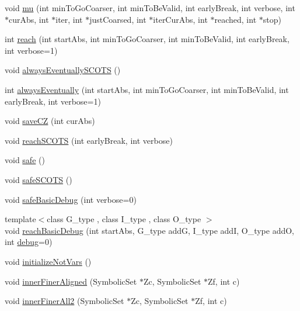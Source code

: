 \begin{DoxyCompactItemize}
\item 
void \hyperlink{classscots_1_1Adaptive_a56ba7fb25e948dd1f2fa0c7380ca59e6}{mu} (int min\+To\+Go\+Coarser, int min\+To\+Be\+Valid, int early\+Break, int verbose, int $\ast$cur\+Abs, int $\ast$iter, int $\ast$just\+Coarsed, int $\ast$iter\+Cur\+Abs, int $\ast$reached, int $\ast$stop)
\item 
int \hyperlink{classscots_1_1Adaptive_a94aa585894b725d174c1a33c938a11bf}{reach} (int start\+Abs, int min\+To\+Go\+Coarser, int min\+To\+Be\+Valid, int early\+Break, int verbose=1)
\item 
void \hyperlink{classscots_1_1Adaptive_a6bdf5b60cd9fb7af657091ad5975743d}{always\+Eventually\+S\+C\+O\+TS} ()
\item 
int \hyperlink{classscots_1_1Adaptive_aaf645bf4507f575426dfdd29de47dfe2}{always\+Eventually} (int start\+Abs, int min\+To\+Go\+Coarser, int min\+To\+Be\+Valid, int early\+Break, int verbose=1)
\item 
void \hyperlink{classscots_1_1Adaptive_ad3b8d9cf97cd0967409c14361a40d779}{save\+CZ} (int cur\+Abs)
\item 
void \hyperlink{classscots_1_1Adaptive_aed4f1976c5a2f538c07becbde46381e4}{reach\+S\+C\+O\+TS} (int early\+Break, int verbose)
\item 
void \hyperlink{classscots_1_1Adaptive_a76d026d45bd794eba3ef69c18835dd54}{safe} ()
\item 
void \hyperlink{classscots_1_1Adaptive_afd80e725160ae143493105b2fe99fe02}{safe\+S\+C\+O\+TS} ()
\item 
void \hyperlink{classscots_1_1Adaptive_a1c7b5c07621e61b846b70e949b92b0b7}{safe\+Basic\+Debug} (int verbose=0)
\item 
{\footnotesize template$<$class G\+\_\+type , class I\+\_\+type , class O\+\_\+type $>$ }\\void \hyperlink{classscots_1_1Adaptive_ae1663a6a4ab0ffe2025f954be4fe4116}{reach\+Basic\+Debug} (int start\+Abs, G\+\_\+type addG, I\+\_\+type addI, O\+\_\+type addO, int \hyperlink{classscots_1_1Adaptive_a8ea5724cde577baf708496d6bef7e548}{debug}=0)
\item 
void \hyperlink{classscots_1_1Adaptive_a6a9af6f25e8c4015ceb24d704da26972}{initialize\+Not\+Vars} ()
\item 
void \hyperlink{classscots_1_1Adaptive_af4c5423a62b8c11110d0a2bdcc96d4fb}{inner\+Finer\+Aligned} (Symbolic\+Set $\ast$Zc, Symbolic\+Set $\ast$Zf, int c)
\item 
void \hyperlink{classscots_1_1Adaptive_a4054eda5087611f78dddb2c378fcbb6e}{inner\+Finer\+All2} (Symbolic\+Set $\ast$Zc, Symbolic\+Set $\ast$Zf, int c)

\end{DoxyCompactItemize}
